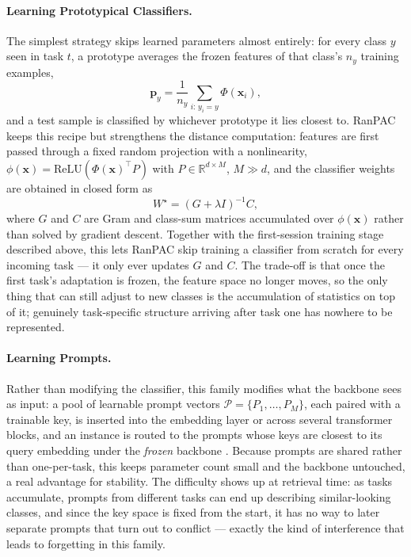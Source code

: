 \documentclass{article}
\begin{document}
\paragraph{Learning Prototypical Classifiers.}
The simplest strategy skips learned parameters almost entirely: for every
class $y$ seen in task $t$, a prototype averages the frozen features of
that class's $n_y$ training examples,
\begin{equation}
  \mathbf{p}_y = \frac{1}{n_y}\sum_{i:\,y_i=y} \Phi(\mathbf{x}_i),
  \label{eq:prototype}
\end{equation}
and a test sample is classified by whichever prototype it lies closest to.
RanPAC \citep{mcdonnell2023ranpac} keeps this recipe but strengthens the
distance computation: features are first passed through a fixed random
projection with a nonlinearity, $\phi(\mathbf{x}) =
\mathrm{ReLU}(\Phi(\mathbf{x})^\top P)$ with $P \in \mathbb{R}^{d \times
M}$, $M \gg d$, and the classifier weights are obtained in closed form as
\begin{equation}
  W^\star = (G + \lambda I)^{-1} C,
  \label{eq:ridge}
\end{equation}
where $G$ and $C$ are Gram and class-sum matrices accumulated over
$\phi(\mathbf{x})$ rather than solved by gradient descent. Together with
the first-session training stage described above, this lets RanPAC skip
training a classifier from scratch for every incoming task --- it only
ever updates $G$ and $C$. The trade-off is that once the first task's
adaptation is frozen, the feature space no longer moves, so the only thing
that can still adjust to new classes is the accumulation of statistics on
top of it; genuinely task-specific structure arriving after task one has
nowhere to be represented.

\paragraph{Learning Prompts.}
Rather than modifying the classifier, this family modifies what the
backbone sees as input: a pool of learnable prompt vectors
$\mathcal{P}=\{P_1,\dots,P_M\}$, each paired with a trainable key, is
inserted into the embedding layer or across several transformer blocks,
and an instance is routed to the prompts whose keys are closest to its
query embedding under the \emph{frozen} backbone
\citep{wang2022learning,wang2022dualprompt,smith2023coda,wang2023hierarchical}.
Because prompts are shared rather than one-per-task, this keeps parameter
count small and the backbone untouched, a real advantage for stability.
The difficulty shows up at retrieval time: as tasks accumulate, prompts
from different tasks can end up describing similar-looking classes, and
since the key space is fixed from the start, it has no way to later
separate prompts that turn out to conflict --- exactly the kind of
interference that leads to forgetting in this family.
\end{document}
